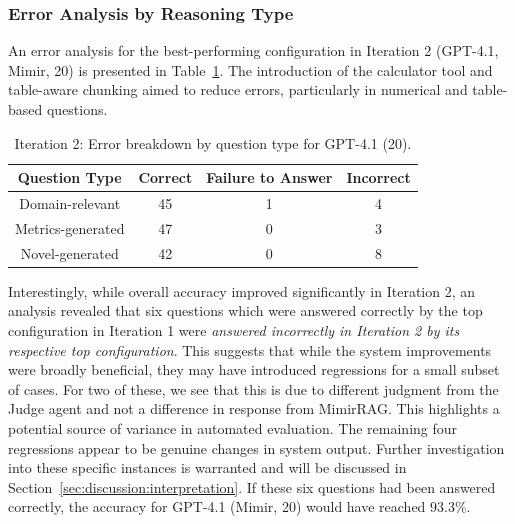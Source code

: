 \documentclass[final,5p,times,twopage,twocolumn,a4paper]{elsarticle}
\begin{document}
\subsubsection{Error Analysis by Reasoning Type}
\label{sec:iter2-error-analysis}
An error analysis for the best-performing configuration in Iteration 2 (GPT-4.1, Mimir, 20) is presented in Table~\ref{tab:question-type-errors-iter2}.
The introduction of the calculator tool and table-aware chunking aimed to reduce errors, particularly in numerical and table-based questions.
%
\begin{table}[!hbt]
\centering
\caption{Iteration 2: Error breakdown by question type for GPT-4.1 (20).}
\label{tab:question-type-errors-iter2}
\begin{tabular}{|c|c|c|c|}
\hline
\textbf{Question Type} & \textbf{Correct} & \textbf{Failure to Answer} & \textbf{Incorrect} \\ \hline
Domain-relevant        & 45               & 1                          & 4                  \\ \hline
Metrics-generated      & 47               & 0                          & 3                  \\ \hline
Novel-generated        & 42               & 0                          & 8                  \\ \hline
\end{tabular}
\end{table}
%
Interestingly, while overall accuracy improved significantly in Iteration 2, an analysis revealed that six questions which were answered correctly by the top configuration in Iteration 1 were \textit{answered incorrectly in Iteration 2 by its respective top configuration}. This suggests that while the system improvements were broadly beneficial, they may have introduced regressions for a small subset of cases. For two of these, we see that this is due to different judgment from the Judge agent and not a difference in response from MimirRAG. This highlights a potential source of variance in automated evaluation. The remaining four regressions appear to be genuine changes in system output. Further investigation into these specific instances is warranted and will be discussed in Section~\ref{sec:discussion:interpretation}. If these six questions had been answered correctly, the accuracy for GPT-4.1 (Mimir, 20) would have reached 93.3\%.
\end{document}
